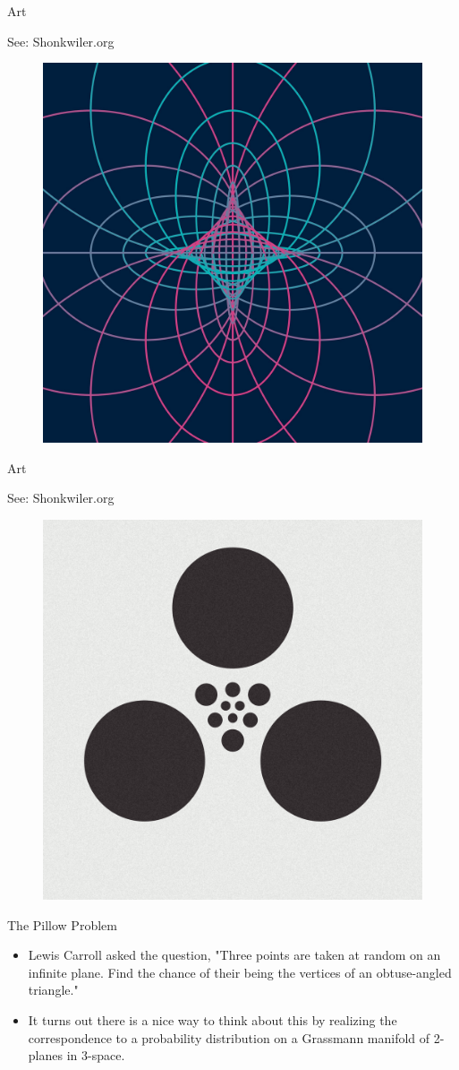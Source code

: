 \documentclass[usenames,dvipsnames]{beamer}
\theoremstyle{definition}
\theoremstyle{theorem}
\begin{document}
    \begin{frame}{Art}
    \begin{center}
        See: Shonkwiler.org
        \begin{figure}
            \centering
            \includegraphics[width=.6\textwidth]{37205108544_283ce78bbf_b.jpg}
        \end{figure}
        \end{center}
    \end{frame}
    
        \begin{frame}{Art}
    \begin{center}
        See: Shonkwiler.org
        \begin{figure}
            \centering
            \includegraphics[width=.6\textwidth]{platonic5.png}
        \end{figure}
        \end{center}
    \end{frame}
    
    \begin{frame}{The Pillow Problem}
    \begin{itemize}
        \item Lewis Carroll asked the question, "Three points are taken at random on an infinite plane. Find the chance of their being the vertices of an obtuse-angled triangle."
        \item It turns out there is a nice way to think about this by realizing the correspondence to a probability distribution on a Grassmann manifold of 2-planes in 3-space.
    \end{itemize}

    \end{frame}
        
\end{document}
